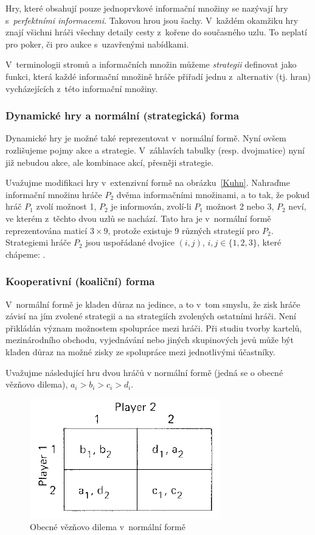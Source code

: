 \documentclass[a5paper,12pt]{article}
\begin{document}
    Hry, které obsahují pouze jednoprvkové informační množiny se nazývají hry s~\emph{perfektními informacemi}. Takovou hrou jsou šachy. V~každém okamžiku hry znají všichni hráči všechny detaily cesty z~kořene do současného uzlu. To neplatí pro poker, či pro aukce s~uzavřenými nabídkami.

    V~terminologii stromů a informačních množin můžeme \emph{strategii} definovat jako funkci, která každé informační množině hráče přiřadí jednu z~alternativ (tj. hran) vycházejících z~této informační množiny. 

    \subsubsection{Dynamické hry a normální (strategická) forma}
    Dynamické hry je možné také reprezentovat v~normální formě. Nyní ovšem rozlišujeme pojmy akce a strategie. V~záhlavích tabulky (resp. dvojmatice) nyní již nebudou akce, ale kombinace akcí, přesněji strategie.

    Uvažujme modifikaci hry v~extenzivní formě na obrázku~\ref{Kuhn}. Nahraďme informační množinu hráče $P_2$ dvěma informačními množinami, a to tak, že pokud hráč $P_1$ zvolí možnost 1, $P_2$ je informován, zvolí-li $P_1$ možnost 2 nebo 3, $P_2$ neví, ve kterém z~těchto dvou uzlů se nachází. Tato hra je v~normální formě reprezentována maticí $3 \times 9$, protože existuje 9 různých strategií pro $P_2$. Strategiemi hráče $P_2$ jsou uspořádané dvojice $(i,j)$, $i,j \in \{1,2,3\}$, které chápeme: . 

    \subsubsection{Kooperativní (koaliční) forma}
    V~normální formě je kladen důraz na jedince, a to v~tom smyslu, že zisk hráče závisí na jím zvolené strategii a na strategiích zvolených ostatními hráči. Není přikládán význam možnostem spolupráce mezi hráči. Při studiu tvorby kartelů, mezinárodního obchodu, vyjednávání nebo jiných skupinových jevů může být kladen důraz na možné zisky ze spolupráce mezi jednotlivými účastníky. 

    Uvažujme následující hru dvou hráčů v normální formě (jedná se o obecné vězňovo dilema), $a_i > b_i > c_i > d_i$.

    \begin{figure}[htb]
    \centering
    \includegraphics[scale=0.35]{1_4.png}
    \caption{ Obecné vězňovo dilema v~normální formě \label{prisoner}}
    \end{figure}
\end{document}
